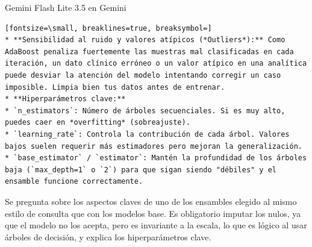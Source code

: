 \documentclass[12pt,a4paper,oneside]{book}
\begin{document}
\begin{iaresp}{Gemini Flash Lite 3.5 en Gemini}
\begin{Verbatim}[fontsize=\small, breaklines=true, breaksymbol=]
* **Sensibilidad al ruido y valores atípicos (*Outliers*):** Como AdaBoost penaliza fuertemente las muestras mal clasificadas en cada iteración, un dato clínico erróneo o un valor atípico en una analítica puede desviar la atención del modelo intentando corregir un caso imposible. Limpia bien tus datos antes de entrenar.
* **Hiperparámetros clave:**
* `n_estimators`: Número de árboles secuenciales. Si es muy alto, puedes caer en *overfitting* (sobreajuste).
* `learning_rate`: Controla la contribución de cada árbol. Valores bajos suelen requerir más estimadores pero mejoran la generalización.
* `base_estimator` / `estimator`: Mantén la profundidad de los árboles baja (`max_depth=1` o `2`) para que sigan siendo "débiles" y el ensamble funcione correctamente.
\end{Verbatim}
\end{iaresp}
\begin{iaanalisis}
Se pregunta sobre los aspectos claves de uno de los ensambles elegido al mismo estilo de consulta que con los modelos base. Es obligatorio imputar los nulos, ya que el modelo no los acepta, pero es invariante a la escala, lo que es lógico al usar árboles de decisión, y explica los hiperparámetros clave.
\end{iaanalisis}
\end{document}

